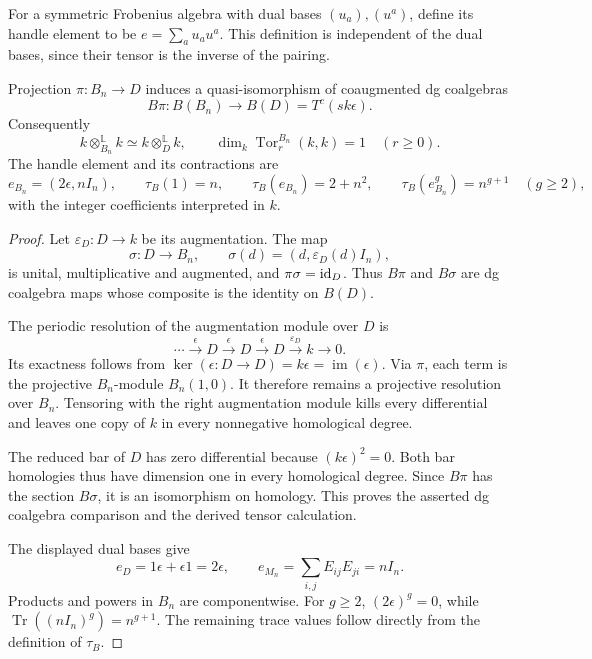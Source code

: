 For a symmetric Frobenius algebra with dual bases $(u_a),(u^a)$, define its handle element to be $e=\sum_a u_a u^a$.
This definition is independent of the dual bases, since their tensor is the inverse of the pairing.

\begin{proposition}\label{prop:Bn}
Projection $\pi:B_n\to D$ induces a quasi-isomorphism of coaugmented dg coalgebras
\[
 B\pi:B(B_n)\longrightarrow B(D)=T^c(s k\epsilon).
\]
Consequently
\[
 k\otimes_{B_n}^{\mathbb L}k\simeq k\otimes_D^{\mathbb L}k,
 \qquad \dim_k\operatorname{Tor}^{B_n}_r(k,k)=1\quad(r\geq0).
\]
The handle element and its contractions are
\[
 e_{B_n}=(2\epsilon,nI_n),\qquad
 \tau_B(1)=n,\qquad \tau_B(e_{B_n})=2+n^2,\qquad
 \tau_B(e_{B_n}^g)=n^{g+1}\quad(g\geq2),
\]
with the integer coefficients interpreted in $k$.
\end{proposition}
\begin{proof}
Let $\varepsilon_D:D\to k$ be its augmentation.
The map
\[
 \sigma:D\longrightarrow B_n,\qquad
 \sigma(d)=(d,\varepsilon_D(d)I_n),
\]
is unital, multiplicative and augmented, and $\pi\sigma=\operatorname{id}_D$.
Thus $B\pi$ and $B\sigma$ are dg coalgebra maps whose composite is the identity on $B(D)$.

The periodic resolution of the augmentation module over $D$ is
\[
 \cdots\xrightarrow{\epsilon}D\xrightarrow{\epsilon}D
       \xrightarrow{\epsilon}D\xrightarrow{\varepsilon_D}k\longrightarrow0.
\]
Its exactness follows from $\ker(\epsilon:D\to D)=k\epsilon=\operatorname{im}(\epsilon)$.
Via $\pi$, each term is the projective $B_n$-module $B_n(1,0)$.
It therefore remains a projective resolution over $B_n$.
Tensoring with the right augmentation module kills every differential and leaves one copy of $k$ in every nonnegative homological degree.

The reduced bar of $D$ has zero differential because $(k\epsilon)^2=0$.
Both bar homologies thus have dimension one in every homological degree.
Since $B\pi$ has the section $B\sigma$, it is an isomorphism on homology.
This proves the asserted dg coalgebra comparison and the derived tensor calculation.

The displayed dual bases give
\[
 e_D=1\epsilon+\epsilon1=2\epsilon,
 \qquad e_{M_n}=\sum_{i,j}E_{ij}E_{ji}=nI_n.
\]
Products and powers in $B_n$ are componentwise.
For $g\geq2$, $(2\epsilon)^g=0$, while
$\operatorname{Tr}((nI_n)^g)=n^{g+1}$.
The remaining trace values follow directly from the definition of $\tau_B$.
\end{proof}

